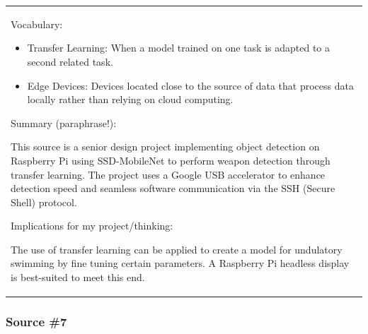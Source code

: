 \begin{longtable}[]{@{}
  >{\raggedright\arraybackslash}p{}@{}}
Vocabulary:

\begin{itemize}
\item
  Transfer Learning: When a model trained on one task is adapted to a
  second related task.
\item
  Edge Devices: Devices located close to the source of data that process
  data locally rather than relying on cloud computing.
\end{itemize}


Summary (paraphrase!):

This source is a senior design project implementing object detection on
Raspberry Pi using SSD-MobileNet to perform weapon detection through
transfer learning. The project uses a Google USB accelerator to enhance
detection speed and seamless software communication via the SSH (Secure
Shell) protocol.


Implications for my project/thinking:

The use of transfer learning can be applied to create a model for
undulatory swimming by fine tuning certain parameters. A Raspberry Pi
headless display is best-suited to meet this end.

\midrule\noalign{}
\endhead
\bottomrule\noalign{}
\endlastfoot
\end{longtable}

\subsubsection{\texorpdfstring{\hfill\break
\textbf{Source \#7}}{ Source \#7}}\label{source-7}

